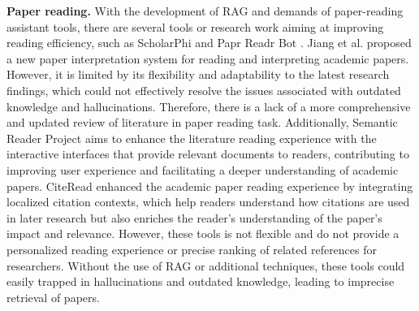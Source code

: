 \textbf{Paper reading.} With the development of RAG and demands of paper-reading assistant tools, there are several tools or research work aiming at improving reading efficiency, such as ScholarPhi \cite{head2021augmenting} and Papr Readr Bot \cite{foo2022papr}. Jiang et al. \cite{jiang2024bridging} proposed a new paper interpretation system for reading and interpreting academic papers. However, it is limited by its flexibility and adaptability to the latest research findings, which could not effectively resolve the issues associated with outdated knowledge and hallucinations. Therefore, there is a lack of a more comprehensive and updated review of literature in paper reading task.
Additionally, Semantic Reader Project \cite{lo2023semantic} aims to enhance the literature reading experience with the interactive interfaces that provide relevant documents to readers, contributing to improving user experience and facilitating a deeper understanding of academic papers. CiteRead \cite{rachatasumrit2022citeread} enhanced the academic paper reading experience by integrating localized citation contexts, which help readers understand how citations are used in later research but also enriches the reader's understanding of the paper's impact and relevance. However, these tools is not flexible and do not provide a personalized reading experience or precise ranking of related references for researchers. Without the use of RAG or additional techniques, these tools could easily trapped in hallucinations and outdated knowledge, leading to imprecise retrieval of papers.